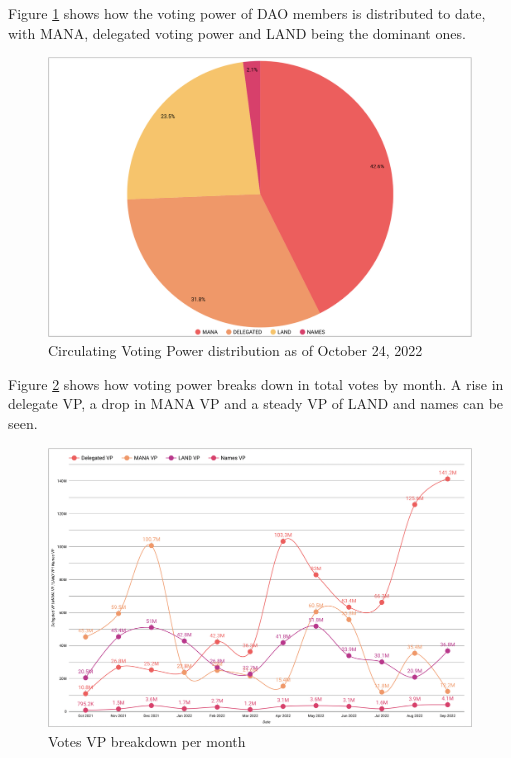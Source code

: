 \documentclass[MSE,Master,english]{twbook}%
\begin{document}
Figure \ref{fig:vp_distribution} shows how the voting power of DAO members is distributed to date, with MANA, delegated voting power and LAND being the dominant ones.
\begin{figure}[H]
  \centering
  \includegraphics[width=\textwidth]{metrics/vp_distribution.png}
  \caption{Circulating Voting Power distribution as of October 24, 2022}
  \label{fig:vp_distribution}
\end{figure}

Figure \ref{fig:votes_vp} shows how voting power breaks down in total votes by month. A rise in delegate VP, a drop in MANA VP and a steady VP of LAND and names can be seen.
\begin{figure}[H]
  \centering
  \includegraphics[width=\textwidth]{metrics/votes_breakdown.png}
  \caption{Votes VP breakdown per month}
  \label{fig:votes_vp}
\end{figure}
\end{document}
